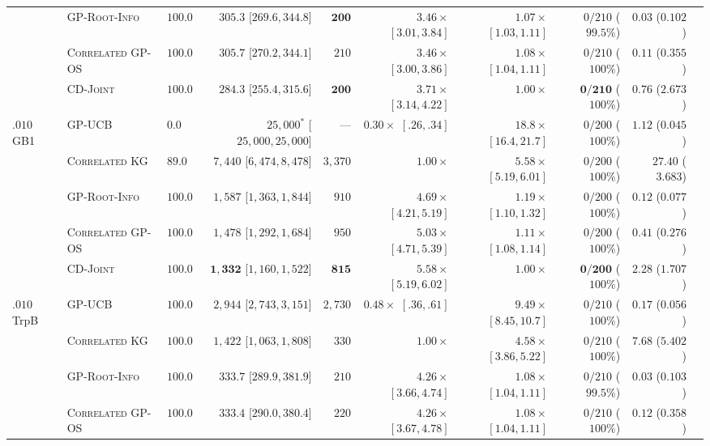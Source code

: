 \documentclass{article}
\theoremstyle{plain}
\theoremstyle{definition}
\begin{document}
\begin{table}[!htbp]
{\begin{tabular}{@{}lllrrrrrrr@{}}
 & \textsc{GP-Root-Info} & $\mathbf{100.0}$ & $305.3$ [$269.6,344.8$] & $\mathbf{200}$ & $3.46\times$ $[3.01,3.84]$ & $1.07\times$ $[1.03,1.11]$ & $0/210$ ($99.5\%$) & $\mathbf{0.03}$ ($0.102$) \\
 & \textsc{Correlated GP-OS} & $\mathbf{100.0}$ & $305.7$ [$270.2,344.1$] & $210$ & $3.46\times$ $[3.00,3.86]$ & $1.08\times$ $[1.04,1.11]$ & $0/210$ ($100\%$) & $0.11$ ($0.355$) \\
 & \textsc{CD-Joint} & $\mathbf{100.0}$ & $\mathbf{284.3}$ [$255.4,315.6$] & $\mathbf{200}$ & $\mathbf{3.71\times}$ $[3.14,4.22]$ & $1.00\times$ & $\mathbf{0/210}$ ($100\%$) & $0.76$ ($2.673$) \\
\midrule
\multirow{5}{*}{$.010$ GB1}
 & \textsc{GP-UCB} & $0.0$ & $25{,}000^*$ [$25{,}000,25{,}000$] & --- & $0.30\times$ $[.26,.34]$ & $18.8\times$ $[16.4,21.7]$ & $0/200$ ($100\%$) & $1.12$ ($0.045$) \\
 & \textsc{Correlated KG} & $89.0$ & $7{,}440$ [$6{,}474,8{,}478$] & $3{,}370$ & $1.00\times$ & $5.58\times$ $[5.19,6.01]$ & $0/200$ ($100\%$) & $27.40$ ($3.683$) \\
 & \textsc{GP-Root-Info} & $\mathbf{100.0}$ & $1{,}587$ [$1{,}363,1{,}844$] & $910$ & $4.69\times$ $[4.21,5.19]$ & $1.19\times$ $[1.10,1.32]$ & $0/200$ ($100\%$) & $\mathbf{0.12}$ ($0.077$) \\
 & \textsc{Correlated GP-OS} & $\mathbf{100.0}$ & $1{,}478$ [$1{,}292,1{,}684$] & $950$ & $5.03\times$ $[4.71,5.39]$ & $1.11\times$ $[1.08,1.14]$ & $0/200$ ($100\%$) & $0.41$ ($0.276$) \\
 & \textsc{CD-Joint} & $\mathbf{100.0}$ & $\mathbf{1{,}332}$ [$1{,}160,1{,}522$] & $\mathbf{815}$ & $\mathbf{5.58\times}$ $[5.19,6.02]$ & $1.00\times$ & $\mathbf{0/200}$ ($100\%$) & $2.28$ ($1.707$) \\
\midrule
\multirow{5}{*}{$.010$ TrpB}
 & \textsc{GP-UCB} & $\mathbf{100.0}$ & $2{,}944$ [$2{,}743,3{,}151$] & $2{,}730$ & $0.48\times$ $[.36,.61]$ & $9.49\times$ $[8.45,10.7]$ & $0/210$ ($100\%$) & $0.17$ ($0.056$) \\
 & \textsc{Correlated KG} & $\mathbf{100.0}$ & $1{,}422$ [$1{,}063,1{,}808$] & $330$ & $1.00\times$ & $4.58\times$ $[3.86,5.22]$ & $0/210$ ($100\%$) & $7.68$ ($5.402$) \\
 & \textsc{GP-Root-Info} & $\mathbf{100.0}$ & $333.7$ [$289.9,381.9$] & $210$ & $4.26\times$ $[3.66,4.74]$ & $1.08\times$ $[1.04,1.11]$ & $0/210$ ($99.5\%$) & $\mathbf{0.03}$ ($0.103$) \\
 & \textsc{Correlated GP-OS} & $\mathbf{100.0}$ & $333.4$ [$290.0,380.4$] & $220$ & $4.26\times$ $[3.67,4.78]$ & $1.08\times$ $[1.04,1.11]$ & $0/210$ ($100\%$) & $0.12$ ($0.358$) \\

\end{tabular}}
\end{table}
\end{document}
